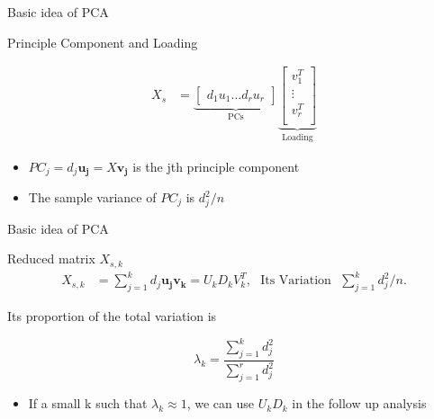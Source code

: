 \documentclass[ignorenonframetext,]{beamer}
\providecommand{\tightlist}{%
  \setlength{\itemsep}{0pt}\setlength{\parskip}{0pt}}
\begin{document}
\begin{frame}{Basic idea of PCA}

\begin{block}{Principle Component and Loading}

\begin{align*} 
  X_s &= \underbrace{\begin{bmatrix} d_1u_1 \hdots  d_ru_r \end{bmatrix} }_\text{PCs}
         \underbrace{\begin{bmatrix} v_1^T \\
                         \vdots \\
                         v_r^T \\
         \end{bmatrix}}_\text{Loading}
\end{align*}

\begin{itemize}
\tightlist
\item
  \(PC_j = d_j\pmb{u_j} = X\pmb{v_j}\) is the jth principle component
\item
  The sample variance of \(PC_j\) is \(d_j^2/n\)
\end{itemize}

\end{block}

\end{frame}

\begin{frame}{Basic idea of PCA}

\begin{block}{Reduced matrix $X_{s,k}$}
\begin{align*}
  X_{s,k} &= \sum_{j=1}^{k}d_j\pmb{u_jv_k} = U_kD_kV_k^T, \text{~~Its Variation ~}  \sum_{j=1}^kd_j^2/n. 
\end{align*}
\end{block}

Its proportion of the total variation is

\[
\lambda_k = \frac{\sum_{j=1}^{k}d_j^2}{\sum_{j=1}^{r}d_j^2} 
\]

\begin{itemize}
\tightlist
\item
  If a small k such that \(\lambda_k \approx 1\), we can use \(U_kD_k\)
  in the follow up analysis
\end{itemize}

\end{frame}
\end{document}
